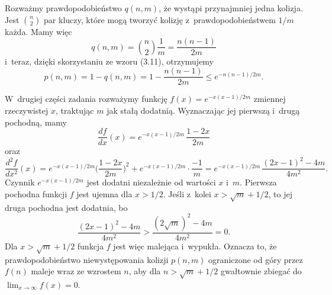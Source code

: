 
\exercise %

\noindent Rozważmy prawdopodobieństwo $q(n,m)$, że wystąpi przynajmniej jedna kolizja.
Jest $\binom{n}{2}$ par kluczy, które mogą tworzyć kolizję z~prawdopodobieństwem $1/m$ każda.
Mamy więc
\[
	q(n,m) = \binom{n}{2}\frac{1}{m} = \frac{n(n-1)}{2m}
\]
i~teraz, dzięki skorzystaniu ze wzoru (3.11), otrzymujemy
\[
	p(n,m) = 1-q(n,m) = 1-\frac{n(n-1)}{2m} \le e^{-n(n-1)/2m}.
\]

W~drugiej części zadania rozważymy funkcję $f(x)=e^{-x(x-1)/2m}$ zmiennej rzeczywistej $x$, traktując $m$ jak stałą dodatnią.
Wyznaczając jej pierwszą i~drugą pochodną, mamy
\[
	\frac{df}{dx}(x) = e^{-x(x-1)/2m}\,\frac{1-2x}{2m}
\]
oraz
\[
	\frac{d^2\!f}{dx^2}(x) = e^{-x(x-1)/2m}\biggl(\frac{1-2x}{2m}\biggr)^2+e^{-x(x-1)/2m}\cdot\frac{-1}{m} = e^{-x(x-1)/2m}\,\frac{(2x-1)^2-4m}{4m^2}.
\]
Czynnik $e^{-x(x-1)/2m}$ jest dodatni niezależnie od wartości $x$ i~$m$.
Pierwsza pochodna funkcji $f$ jest ujemna dla $x>1/2$.
Jeśli z~kolei $x>\sqrt{m}+1/2$, to jej druga pochodna jest dodatnia, bo
\[
	\frac{(2x-1)^2-4m}{4m^2} > \frac{(2\sqrt{m})^2-4m}{4m^2} = 0.
\]
Dla $x>\sqrt{m}+1/2$ funkcja $f$ jest więc malejąca i~wypukła.
Oznacza to, że prawdopodobieństwo niewystępowania kolizji $p(n,m)$ ograniczone od góry przez $f(n)$ maleje wraz ze wzrostem $n$, aby dla $n>\sqrt{m}+1/2$ gwałtownie zbiegać do $\lim_{x\to\infty}f(x)=0$.
